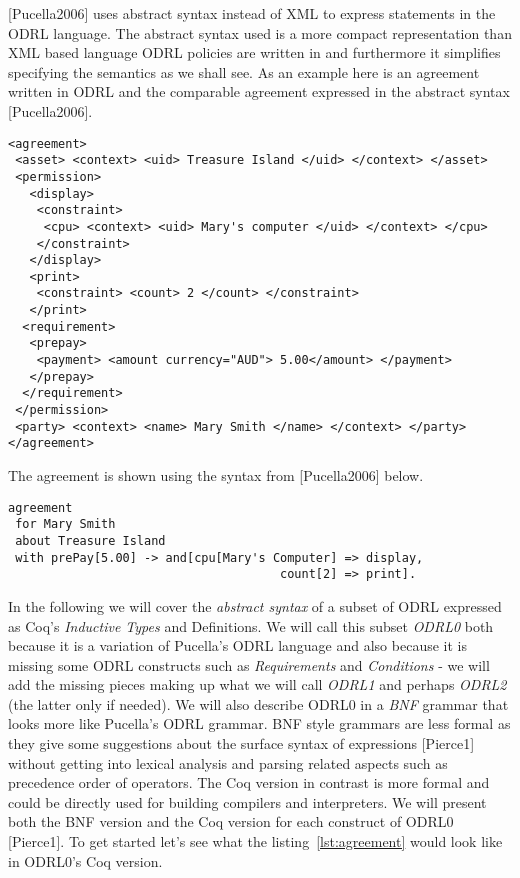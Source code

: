 [Pucella2006] uses abstract syntax instead of XML to express statements in the ODRL language. The abstract syntax used is a more compact representation than XML based language ODRL policies are written in and furthermore it simplifies specifying the semantics as we shall see. As an example here is an agreement written in ODRL and the comparable agreement expressed in the abstract syntax [Pucella2006].

\lstset{language=XML}
\begin{lstlisting}[caption={The Agreement in XML},label={lst:agreementxml}]
<agreement>
 <asset> <context> <uid> Treasure Island </uid> </context> </asset>
 <permission>
   <display>
    <constraint>
     <cpu> <context> <uid> Mary's computer </uid> </context> </cpu>
    </constraint>
   </display>
   <print>
    <constraint> <count> 2 </count> </constraint>
   </print>
  <requirement>
   <prepay>
    <payment> <amount currency="AUD"> 5.00</amount> </payment>
   </prepay>
  </requirement>
 </permission>
 <party> <context> <name> Mary Smith </name> </context> </party>
</agreement>
\end{lstlisting}
The agreement is shown using the syntax from [Pucella2006] below.

\lstset{language=Pucella2006}
\begin{minipage}[c]{0.95\textwidth}
\begin{lstlisting}[frame=single, caption={The Agreement As Pucella2006},label={lst:agreementpucella2006}]
agreement
 for Mary Smith 
 about Treasure Island 
 with prePay[5.00] -> and[cpu[Mary's Computer] => display,
                                      count[2] => print].
\end{lstlisting}
\end{minipage} 

In the following we will cover the \emph{abstract syntax} of a subset of ODRL expressed as Coq's \emph{Inductive Types} and Definitions. We will call this subset \emph{ODRL0} both because it is a variation of Pucella's ODRL language and also because it is missing some ODRL constructs such as \emph{Requirements} and \emph{Conditions} - we will add the missing pieces making up what we will call \emph{ODRL1} and perhaps \emph{ODRL2} (the latter only if needed). We will also describe ODRL0 in a \emph{BNF} grammar that looks more like Pucella's ODRL grammar. BNF style grammars are less formal as they give some suggestions about the surface syntax of expressions [Pierce1] without getting into lexical analysis and parsing related aspects such as precedence order of operators. The Coq version in contrast is more formal and could be directly used for building compilers and interpreters. We will present both the BNF version and the Coq version for each construct of ODRL0 [Pierce1]. To get started let's see what the listing~\ref{lst:agreement} would look like in ODRL0's Coq version.

